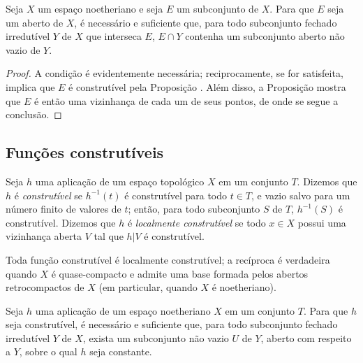\begin{corollary}[9.2.6]
\label{0.9.2.6}
Seja $X$ um espaço noetheriano e seja $E$ um subconjunto de $X$.
Para que $E$ seja um aberto de $X$, é necessário e suficiente que, para todo subconjunto fechado irredutível $Y$ de $X$ que interseca $E$, $E\cap Y$ contenha um subconjunto aberto não vazio de $Y$.
\end{corollary}

\begin{proof}
A condição é evidentemente necessária; reciprocamente, se for satisfeita, implica que $E$ é construtível pela Proposição .
Além disso, a Proposição  mostra que $E$ é então uma vizinhança de cada um de seus pontos, de onde se segue a conclusão.
\end{proof}

\subsection{Funções construtíveis}
\label{subsection:0.9.3}

\begin{definition}[9.3.1]
\label{0.9.3.1}
Seja $h$ uma aplicação de um espaço topológico $X$ em um conjunto $T$.
Dizemos que $h$ é \emph{construtível} se $h^{-1}(t)$ é construtível para todo $t\in T$, e vazio salvo para um número finito de valores de $t$; então, para todo subconjunto $S$ de $T$, $h^{-1}(S)$ é construtível.
Dizemos que $h$ é \emph{localmente construtível} se todo $x\in X$ possui uma vizinhança aberta $V$ tal que $h|V$ é construtível.
\end{definition}

Toda função construtível é localmente construtível; a recíproca é verdadeira quando $X$ é quase-compacto e admite uma base formada pelos abertos retrocompactos de $X$ (em particular, quando $X$ é noetheriano).

\begin{proposition}[9.3.2]
\label{0.9.3.2}
Seja $h$ uma aplicação de um espaço noetheriano $X$ em um conjunto $T$.
Para que $h$ seja construtível, é necessário e suficiente que, para todo subconjunto fechado irredutível $Y$ de $X$, exista um subconjunto não vazio $U$ de $Y$, aberto com respeito a $Y$, sobre o qual $h$ seja constante.
\end{proposition}

